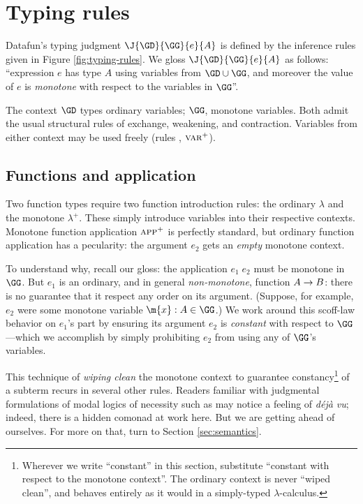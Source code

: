 
\section{Typing rules}
\label{sec:typing-rules}

Datafun's typing judgment $\J{\GD}{\GG}{e}{A}$ is defined by the inference rules
given in Figure \ref{fig:typing-rules}. We gloss $\J{\GD}{\GG}{e}{A}$ as
follows: ``expression $e$ has type $A$ using variables from $\GD \cup \GG$, and
moreover the value of $e$ is \emph{monotone} with respect to the variables in
$\GG$''.

The context $\GD$ types ordinary variables; $\GG$, monotone variables. Both
admit the usual structural rules of exchange, weakening, and contraction.
Variables from either context may be used freely (rules , $\textsc{var}^+$).

\subsection{Functions and application}
Two function types require two function introduction rules: the ordinary
$\lambda$ and the monotone $\lambda^+$. These simply introduce variables into
their respective contexts. Monotone function application $\textsc{app}^+$ is
perfectly standard, but ordinary function application  has a pecularity:
the argument $e_2$ gets an \emph{empty} monotone context.

To understand why, recall our gloss: the application $e_1\;e_2$ must be monotone
in $\GG$. But $e_1$ is an ordinary, and in general \emph{non-monotone}, function
$A \to B$: there is no guarantee that it respect any order on its argument.
(Suppose, for example, $e_2$ were some monotone variable $\m{x} : A \in \GG$.)
We work around this scoff-law behavior on $e_1$'s part by ensuring its argument
$e_2$ is \emph{constant} with respect to $\GG$---which we accomplish by simply
prohibiting $e_2$ from using any of $\GG$'s variables.

This technique of \emph{wiping clean} the monotone context to guarantee
constancy\footnote{Wherever we write ``constant'' in this section, substitute
  ``constant with respect to the monotone context''. The ordinary context is
  never ``wiped clean'', and behaves entirely as it would in a simply-typed
  $\lambda$-calculus.} of a subterm recurs in several other rules. Readers
familiar with judgmental formulations of modal logics of necessity such as
\citet{jrml} may notice a feeling of \textit{d\'ej\`a vu}; indeed, there is a
hidden comonad at work here. But we are getting ahead of ourselves. For more on
that, turn to Section \ref{sec:semantics}.

